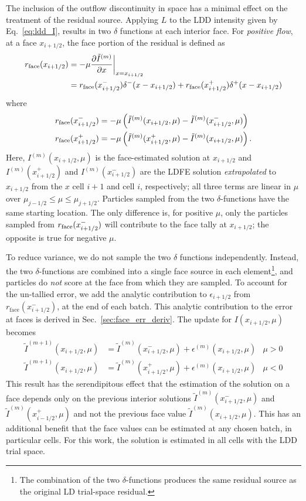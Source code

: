 The inclusion of the outflow discontinuity in space has a minimal effect on the treatment of the
residual source.
Applying $L$ to the LDD intensity given by Eq.~\eqref{eq:ldd_I}, results in two $\delta$ functions at each interior face.
For \emph{positive flow}, at a face $x_{i+1/2}$, the face portion of the residual is defined as
\begin{align}
    \label{eq:res_face}
    r_{\text{face}}(x_{i+1/2}) &= -\mu \frac{\partial \tilde I^{(m)}}{\partial x}\bigg|_{x=x_{i+1/2}}\\
    &= r_{\text{face}}(x_{i+1/2}^-)\delta^-(x - x_{i+1/2}) + r_{\text{face}}(x_{i+1/2}^+)\delta^+(x - x_{i+1/2}) 
\end{align}
where
\begin{align}
    r_{\text{face}}(x_{i+1/2}^-) &= -\mu\left( \tilde I^{(m)}(x_{i+1/2},\mu) - \tilde I^{(m)}(x_{i+1/2}^-,\mu)
           \right)\\
    r_{\text{face}}(x_{i+1/2}^+) &= -\mu\left( \tilde I^{(m)}(x_{i+1/2}^+,\mu) -
           \tilde I^{(m)}(x_{i+1/2},\mu)
           \right).
\end{align}
Here, $I^{(m)}(x_{i+1/2},\mu)$ is the face-estimated solution at $x_{i+1/2}$ and
$I^{(m)}(x_{i+1/2}^+)$ and $I^{(m)}(x_{i+1/2}^-)$ are the LDFE solution
\emph{extrapolated} to $x_{i+1/2}$ from the $x$ cell $i+1$ and cell $i$, respectively; all
three terms are linear in
$\mu$ over $\mu_{j-1/2} \leq \mu \leq \mu_{j+1/2}$.  Particles sampled from the
two $\delta$-functions have the same starting location.  The only difference is, for
positive $\mu$, only the particles sampled from $r_{\text{face}}(x^-_{i+1/2})$ will contribute to the face
tally at $x_{i+1/2}$; the opposite is true for negative $\mu$.  

To reduce variance, we do not sample the two $\delta$ functions independently.
Instead, the
two $\delta$-functions are combined into a single face source in each element\footnote{The combination of the two $\delta$-functions produces the same residual source as the
original LD trial-space residual.},
and particles do \emph{not} score at the face from which they are sampled.  To account for the
un-tallied error, we add the analytic
contribution to $\epsilon_{i+1/2}$ from $r_{\text{face}}(x_{i+1/2}^-)$, at the end of
each batch.  This analytic contribution to the error at faces is derived in Sec.~\ref{sec:face_err_deriv}. 
The update for $I(x_{i+1/2},\mu)$ becomes
\begin{align}
   \tilde I^{(m+1)}(x_{i+1/2},\mu)  &= \tilde I^{(m)}(x_{i+1/2}^-,\mu) +
   \epsilon^{(m)}(x_{i+1/2},\mu) & \mu > 0 \\
   \tilde I^{(m+1)}(x_{i+1/2},\mu)  &= \tilde I^{(m)}(x_{i+1/2}^+,\mu) +
   \epsilon^{(m)}(x_{i+1/2},\mu) & \mu < 0
\end{align}
This result has the serendipitous effect that the estimation of the solution on a face depends only on
the previous interior solutions $\tilde I^{(m)}(x_{i+1/2}^-,\mu)$ and $\tilde
I^{(m)}(x_{i-1/2}^+,\mu)$ and not the previous face value 
$\tilde I^{(m)}(x_{i+1/2},\mu)$. This has an additional benefit that the face values can
be estimated at any chosen batch, in particular cells.  For this work, the solution is
estimated in all cells with the LDD trial space.  



